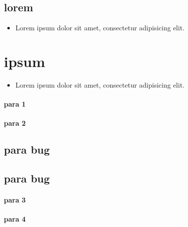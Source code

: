 \subsection{lorem}
\label{autosec:3}
    \begin{itemize}[noitemsep]
        \item Lorem ipsum dolor sit amet, consectetur adipisicing elit.
    \end{itemize}
\section{ipsum}
\label{autosec:4}
    \begin{itemize}[noitemsep]
        \item Lorem ipsum dolor sit amet, consectetur adipisicing elit.
    \end{itemize}
\paragraph{para 1}
\label{autosec:5}
\paragraph{para 2}
\label{autosec:5}
\subsection{para bug}
\label{autosec:5}
\vspace{-36pt}\hspace{11pt}
\subsection{para bug}
\label{autosec:6}
\vspace{-36pt}\hspace{11pt}
\paragraph{para 3}
\label{autosec:7}
\paragraph{para 4}
\label{autosec:7}
